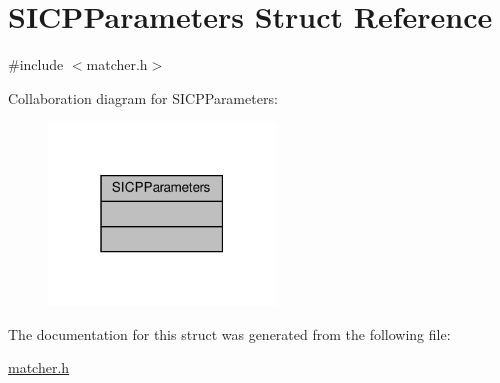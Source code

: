 \hypertarget{structSICPParameters}{}\section{S\+I\+C\+P\+Parameters Struct Reference}
\label{structSICPParameters}


{\ttfamily \#include $<$matcher.\+h$>$}



Collaboration diagram for S\+I\+C\+P\+Parameters\+:\nopagebreak
\begin{figure}[H]
\begin{center}
\leavevmode
\includegraphics[width=171pt]{d5/d94/structSICPParameters__coll__graph}
\end{center}
\end{figure}


The documentation for this struct was generated from the following file\+:\begin{DoxyCompactItemize}
\item 
\hyperlink{matcher_8h}{matcher.\+h}\end{DoxyCompactItemize}
